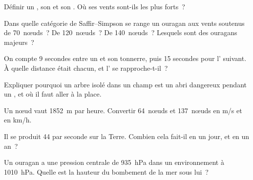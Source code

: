 \begin{exercise}[$\star$]\label{exo:g10:storms-and-cyclones:2}
Définir un , son  et son . Où ses vents
sont-ils les plus forts~?
\end{exercise}

\begin{exercise}[$\star$]\label{exo:g10:storms-and-cyclones:3}
Dans quelle catégorie de Saffir--Simpson se range un ouragan aux vents
soutenus de \num{70}~nœuds~? De \num{120}~nœuds~? De \num{140}~nœuds~?
Lesquels sont des ouragans majeurs~?
\end{exercise}

\begin{exercise}[$\star$]\label{exo:g10:storms-and-cyclones:4}
On compte \num{9} secondes entre un  et son tonnerre, puis \num{15}
secondes pour l' suivant. À quelle distance était chacun, et l'
se rapproche-t-il~?
\end{exercise}

\begin{exercise}[$\star$]\label{exo:g10:storms-and-cyclones:5}
Expliquer pourquoi un arbre isolé dans un champ est un abri dangereux
pendant un , et où il faut aller à la place.
\end{exercise}

\begin{exercise}[$\star\star$]\label{exo:g10:storms-and-cyclones:6}
Un nœud vaut \qty{1852}{m} par heure. Convertir \num{64}~nœuds et
\num{137}~nœuds en \unit{m/s} et en \unit{km/h}.
\end{exercise}

\begin{exercise}[$\star\star$]\label{exo:g10:storms-and-cyclones:7}
Il se produit 44  par seconde sur la Terre. Combien cela fait-il en
un jour, et en un an~?
\end{exercise}

\begin{exercise}[$\star\star$]\label{exo:g10:storms-and-cyclones:8}
Un ouragan a une pression centrale de \qty{935}{hPa} dans un environnement
à \qty{1010}{hPa}. Quelle est la hauteur du bombement de la mer sous lui~?
\end{exercise}

